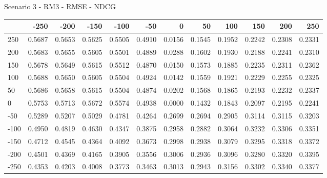 Scenario 3 - RM3 - RMSE - NDCG
\begin{tabular}{lrrrrrrrrrrr}
\toprule
{} &   -250 &   -200 &   -150 &   -100 &   -50  &    0   &    50  &    100 &    150 &    200 &    250 \\
\midrule
 250 & 0.5687 & 0.5653 & 0.5625 & 0.5505 & 0.4910 & 0.0156 & 0.1545 & 0.1952 & 0.2242 & 0.2308 & 0.2331 \\
 200 & 0.5683 & 0.5655 & 0.5605 & 0.5501 & 0.4889 & 0.0288 & 0.1602 & 0.1930 & 0.2188 & 0.2241 & 0.2310 \\
 150 & 0.5678 & 0.5649 & 0.5615 & 0.5512 & 0.4870 & 0.0150 & 0.1573 & 0.1885 & 0.2235 & 0.2311 & 0.2362 \\
 100 & 0.5688 & 0.5650 & 0.5605 & 0.5504 & 0.4924 & 0.0142 & 0.1559 & 0.1921 & 0.2229 & 0.2255 & 0.2325 \\
 50  & 0.5686 & 0.5658 & 0.5615 & 0.5504 & 0.4874 & 0.0202 & 0.1568 & 0.1865 & 0.2193 & 0.2232 & 0.2337 \\
 0   & 0.5753 & 0.5713 & 0.5672 & 0.5574 & 0.4938 & 0.0000 & 0.1432 & 0.1843 & 0.2097 & 0.2195 & 0.2241 \\
-50  & 0.5289 & 0.5207 & 0.5029 & 0.4781 & 0.4264 & 0.2699 & 0.2694 & 0.2905 & 0.3114 & 0.3115 & 0.3203 \\
-100 & 0.4950 & 0.4819 & 0.4630 & 0.4347 & 0.3875 & 0.2958 & 0.2882 & 0.3064 & 0.3232 & 0.3306 & 0.3351 \\
-150 & 0.4712 & 0.4545 & 0.4364 & 0.4092 & 0.3673 & 0.2998 & 0.2938 & 0.3079 & 0.3295 & 0.3318 & 0.3372 \\
-200 & 0.4501 & 0.4369 & 0.4165 & 0.3905 & 0.3556 & 0.3006 & 0.2936 & 0.3096 & 0.3280 & 0.3320 & 0.3395 \\
-250 & 0.4353 & 0.4203 & 0.4008 & 0.3773 & 0.3463 & 0.3013 & 0.2943 & 0.3156 & 0.3302 & 0.3340 & 0.3377 \\
\bottomrule
\end{tabular}

